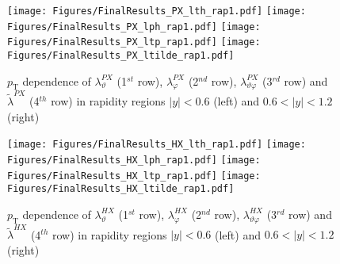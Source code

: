 \documentclass[12pt]{article}
\newcommand{\pT}{p_\mathrm{T}}
\newcommand{\absy}{\left |  y \right |}
\newcommand{\lamthHX}{\lambda^{\scriptscriptstyle HX}_\vartheta}
\newcommand{\lamphHX}{\lambda^{\scriptscriptstyle HX}_\varphi}
\newcommand{\lamthphHX}{\lambda^{\scriptscriptstyle HX}_{\vartheta \varphi}}
\newcommand{\lamtildeHX}{\tilde{\lambda}^{\scriptscriptstyle HX}}
\newcommand{\lamthPX}{\lambda^{\scriptscriptstyle PX}_\vartheta}
\newcommand{\lamphPX}{\lambda^{\scriptscriptstyle PX}_\varphi}
\newcommand{\lamthphPX}{\lambda^{\scriptscriptstyle PX}_{\vartheta \varphi}}
\newcommand{\lamtildePX}{\tilde{\lambda}^{\scriptscriptstyle PX}}
\begin{document}



\begin{figure}[htbp]
\centering
\texttt{[image: Figures/FinalResults\_PX\_lth\_rap1.pdf]}
\texttt{[image: Figures/FinalResults\_PX\_lph\_rap1.pdf]}
\texttt{[image: Figures/FinalResults\_PX\_ltp\_rap1.pdf]}
\texttt{[image: Figures/FinalResults\_PX\_ltilde\_rap1.pdf]}
\caption{$\pT$ dependence of $\lamthPX$
(1$^{st}$ row), $\lamphPX$ (2$^{nd}$ row), $\lamthphPX$ (3$^{rd}$ row) and 
$\lamtildePX$ (4$^{th}$ row) in rapidity regions $\absy<0.6$ (left) and
$0.6<\absy<1.2$ (right)}
\end{figure}
\clearpage







\begin{figure}[htbp]
\centering
\texttt{[image: Figures/FinalResults\_HX\_lth\_rap1.pdf]}
\texttt{[image: Figures/FinalResults\_HX\_lph\_rap1.pdf]}
\texttt{[image: Figures/FinalResults\_HX\_ltp\_rap1.pdf]}
\texttt{[image: Figures/FinalResults\_HX\_ltilde\_rap1.pdf]}
\caption{$\pT$ dependence of $\lamthHX$
(1$^{st}$ row), $\lamphHX$ (2$^{nd}$ row), $\lamthphHX$ (3$^{rd}$ row) and 
$\lamtildeHX$ (4$^{th}$ row) in rapidity regions $\absy<0.6$ (left) and
$0.6<\absy<1.2$ (right)}
\end{figure}
\clearpage



\end{document}
